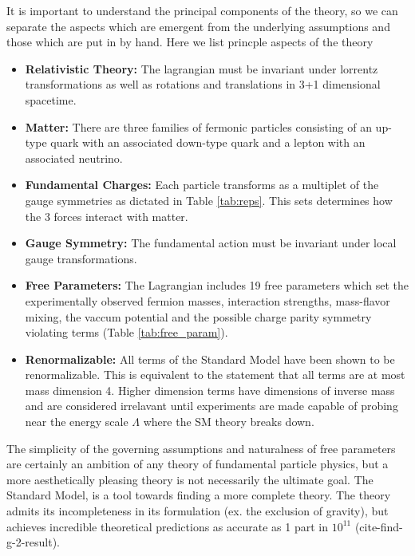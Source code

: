 It is important to understand the principal components of the theory, so we can separate the aspects which are emergent from the underlying assumptions and those which are put in by hand. Here we list princple aspects of the theory
\begin{itemize}
\item \textbf{Relativistic Theory:} The lagrangian must be invariant under lorrentz transformations as well as rotations and translations in 3+1 dimensional spacetime. 
\item \textbf{Matter:} There are three families of fermonic particles consisting of an up-type quark with an associated 
down-type quark and a lepton with an associated neutrino.
\item \textbf{Fundamental Charges:} Each particle transforms as a multiplet of the gauge symmetries as dictated in Table \ref{tab:reps}. This sets determines how the 3 forces interact with matter. 
\item \textbf{Gauge Symmetry:} The fundamental action must be invariant under local gauge transformations.
\item \textbf{Free Parameters:} The Lagrangian includes 19 free parameters which set the experimentally observed fermion masses, interaction strengths, mass-flavor mixing, the vaccum potential and the possible charge parity symmetry violating terms (Table \ref{tab:free_param}). 
\item \textbf{Renormalizable:} All terms of the Standard Model have been shown to be renormalizable. 
This is equivalent to the statement that all terms are at most mass dimension 4. Higher dimension terms have dimensions
of inverse mass and are considered irrelavant until experiments are made capable of probing near the energy scale $\Lambda$ where the SM theory breaks down.
\end{itemize}  

The simplicity of the governing assumptions and naturalness of free parameters are certainly 
an ambition of any theory of fundamental particle physics, but a more aesthetically 
pleasing theory is not necessarily the ultimate goal. The Standard
Model, is  a tool towards finding a more complete theory. The theory admits its
incompleteness in its formulation (ex. the exclusion of gravity), but achieves
incredible theoretical predictions as accurate as 1 part in $10^{11}$ (cite-find-g-2-result). 

